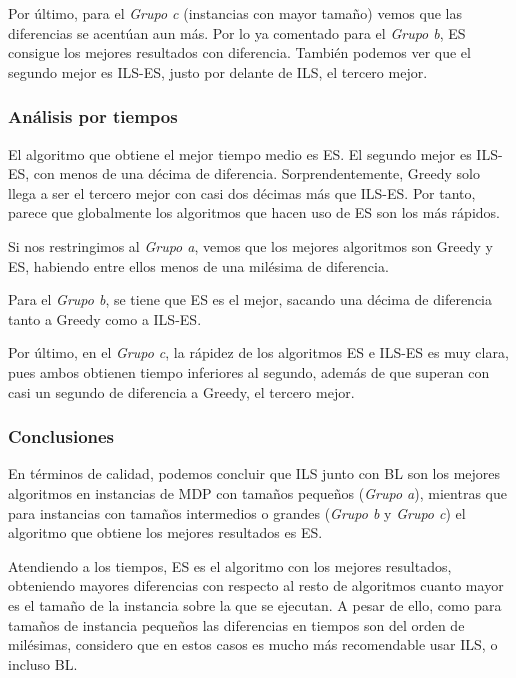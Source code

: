 \documentclass[10pt,a4paper]{article}
\begin{document}
Por último, para el \textit{Grupo c} (instancias con mayor tamaño) vemos que las diferencias se acentúan aun más. Por lo ya comentado para el \textit{Grupo b}, ES consigue los mejores resultados con diferencia. También podemos ver que el segundo mejor es ILS-ES, justo por delante de ILS, el tercero mejor.



\subsubsection{Análisis por tiempos}

El algoritmo que obtiene el mejor tiempo medio es ES. El segundo mejor es ILS-ES, con menos de una décima de diferencia. Sorprendentemente, Greedy solo llega a ser el tercero mejor con casi dos décimas más que ILS-ES. Por tanto, parece que globalmente los algoritmos que hacen uso de ES son los más rápidos.

Si nos restringimos al \textit{Grupo a}, vemos que los mejores algoritmos son Greedy y ES, habiendo entre ellos menos de una milésima de diferencia.

Para el \textit{Grupo b}, se tiene que ES es el mejor, sacando una décima de diferencia tanto a Greedy como a ILS-ES.

Por último, en el \textit{Grupo c}, la rápidez de los algoritmos ES e ILS-ES es muy clara, pues ambos obtienen tiempo inferiores al segundo, además de que superan con casi un segundo de diferencia a Greedy, el tercero mejor.


\subsubsection{Conclusiones}

En términos de calidad, podemos concluir que ILS junto con BL son los mejores algoritmos en instancias de MDP con tamaños pequeños (\textit{Grupo a}), mientras que para instancias con tamaños intermedios o grandes (\textit{Grupo b} y \textit{Grupo c}) el algoritmo que obtiene los mejores resultados es ES.

Atendiendo a los tiempos, ES es el algoritmo con los mejores resultados, obteniendo mayores diferencias con respecto al resto de algoritmos cuanto mayor es el tamaño de la instancia sobre la que se ejecutan. A pesar de ello, como para tamaños de instancia pequeños las diferencias en tiempos son del orden de milésimas, considero que en estos casos es mucho más recomendable usar ILS, o incluso BL.
\end{document}
